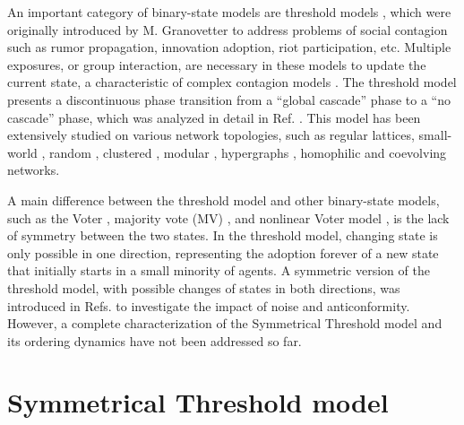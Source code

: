 An important category of binary-state models are threshold models \cite{watts-2002}, which were originally introduced by M. Granovetter \cite{granovetter-1978} to address problems of social contagion such as rumor propagation, innovation adoption, riot participation, etc. Multiple exposures, or group interaction, are necessary in these models to update the current state, a characteristic of complex contagion models \cite{centola-2007,unknown-author-2018}. The threshold model presents a discontinuous phase transition from a ``global cascade'' phase to a ``no cascade'' phase, which was analyzed in detail in Ref. \cite{watts-2002}. This model has been extensively studied on various network topologies, such as regular lattices, small-world \cite{centola-2007}, random \cite{gleeson-2007}, clustered \cite{hackett-2011,hackett-2013}, modular \cite{gleeson-2008}, hypergraphs \cite{de-arruda-2020}, homophilic \cite{diaz-diaz-2022} and coevolving \cite{min2023threshold} networks. 
	
A main difference between the threshold model and other binary-state models, such as the Voter \cite{Voter-original}, majority vote (MV) \cite{de1992isotropic,pereira2005majority,campos2003small}, and nonlinear Voter model \cite{castellano-2009,mobilia2015nonlinear,mellor2016characterization,Min-2017,jewski-2017,peralta-2018}, is the lack of symmetry between the two states. In the threshold model, changing state is only possible in one direction, representing the adoption forever of a new state that initially starts in a small minority of agents. A symmetric version of the threshold model, with possible changes of states in both directions, was introduced in Refs. \cite{nowak2019homogeneous,nowak2020symmetrical} to investigate the impact of noise and anticonformity. However, a complete characterization of the Symmetrical Threshold model and its ordering dynamics have not been addressed so far.

\section{\label{Symmetrical Threshold model} Symmetrical Threshold model}


